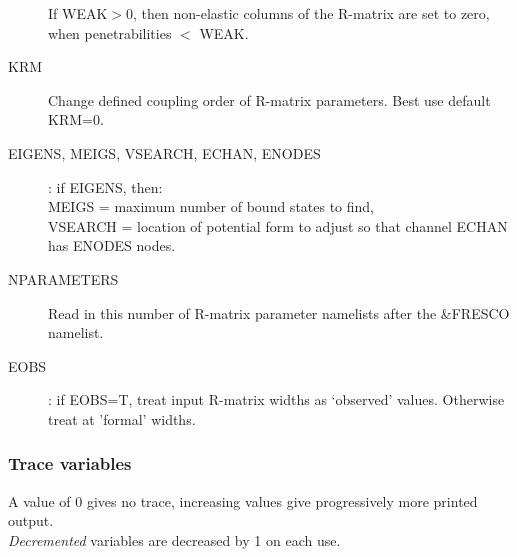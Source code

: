 \documentclass[11pt]{article}
\begin{document}
\begin{description}
If WEAK$>$0, then non-elastic columns of the R-matrix are set to zero,
  when penetrabilities $<$ WEAK.
  
\item[KRM]
Change defined coupling order of R-matrix parameters. Best use default KRM=0.
 
\item[EIGENS, MEIGS, VSEARCH, ECHAN, ENODES] : if EIGENS, then: \\
MEIGS = maximum number of bound states to find, \\
VSEARCH =  location of potential form to adjust so that channel ECHAN has ENODES nodes.

\item[NPARAMETERS] Read in this number of R-matrix parameter namelists after the \&FRESCO namelist.

\item[EOBS] : if EOBS=T, treat input R-matrix widths as `observed' values. Otherwise treat at 'formal' widths.
\end{description}

\subsubsection{Trace variables}
A value of 0 gives no trace,
increasing values give progressively more printed output.\\
{\em Decremented} variables are decreased by 1 on each use.
\end{document}
